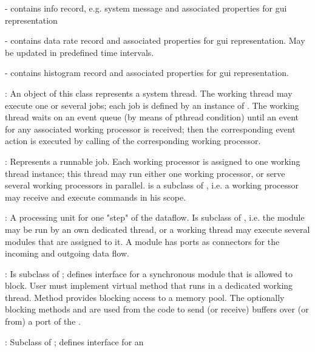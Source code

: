\begin{description}
\begin{compactitem}[$\bullet$]
\item {} - contains info record, e.g. system message 
      and associated properties for gui representation
\item {} - contains data rate record and associated 
      properties for gui representation. May be updated in predefined time intervals.
\item {} - contains histogram record and 
      associated properties for gui representation.
\end{compactitem}
\item[\class{dabc::WorkingThread}] : An object of this class represents a system thread. 
   The working thread may execute one or several jobs; each job is defined 
   by an instance of . The working thread waits on an 
   event queue (by means of pthread condition) until an event for any 
   associated working processor is received; then the corresponding event action is 
   executed by calling  of the corresponding working processor.
\item[\class{dabc::WorkingProcessor}] : Represents a runnable job. Each 
   working processor is assigned to one working thread instance; 
   this thread may run either one working processor, or serve several
    working processors in parallel. 
     is a subclass of , 
   i.e. a working processor may receive and execute commands in 
   his scope. 
\item[\class{dabc::Module}] : A processing unit for one "step" of the dataflow. 
   Is subclass of , i.e. the module may be run by an own 
   dedicated thread, or a working thread may execute several modules that 
   are assigned to it. A module has ports as connectors for the 
   incoming and outgoing data flow.   
\item[\class{dabc::ModuleSync}] : Is subclass of ; defines interface for a 
   synchronous module that is allowed to block. User must implement virtual 
   method  that runs in a dedicated working thread. 
   Method  provides blocking access to a memory pool. 
   The optionally blocking methods  and
     are used from the  
    code to send (or receive) buffers over (or from) 
    a port of the .  
\item[\class{dabc::ModuleAsync}] : Subclass of ; defines interface for an 

\end{description}
